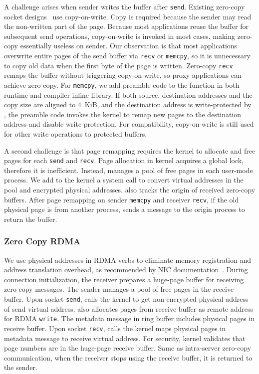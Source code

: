 A challenge arises when sender writes the buffer after \texttt{send}.
Existing zero-copy socket designs~\cite{thadani1995efficient,chu1996zero} use copy-on-write. Copy is required because the sender may read the non-written part of the page.
Because most applications reuse the buffer for subsequent send operations, copy-on-write is invoked in most cases, making zero-copy essentially useless on sender.
Our observation is that most applications overwrite entire pages of the send buffer via \texttt{recv} or \texttt{memcpy}, so it is unnecessary to copy old data when the first byte of the page is written.
Zero-copy \texttt{recv} remaps the buffer without triggering copy-on-write, so proxy applications can achieve zero copy.
For \texttt{memcpy}, we add preamble code to the function in both \libipc{} runtime and compiler inline library. If both source, destination addresses and the copy size are aligned to 4~KiB, and the destination address is write-protected by \libipc{}, the preamble code invokes the kernel to remap new pages to the destination address and disable write protection.
For compatibility, copy-on-write is still used for other write operations to protected buffers.

A second challenge is that page remapping requires the kernel to allocate and free pages for each \texttt{send} and \texttt{recv}. Page allocation in kernel acquires a global lock, therefore it is inefficient. Instead, \libipc{} manages a pool of free pages in each user-mode process.
We add to the kernel a system call to convert virtual addresses in the pool and encrypted physical addresses.
\libipc{} also tracks the origin of received zero-copy buffers.
After page remapping on sender \texttt{memcpy} and receiver \texttt{recv}, if the old physical page is from another process, \libipc{} sends a message to the origin process to return the buffer.

\subsubsection{Zero Copy RDMA}
\label{subsec:zero-copy-rdma}

We use physical addresses in RDMA verbs to eliminate memory registration and address translation overhead, as recommended by NIC documentation~\cite{mellanox}. During connection initialization, the receiver prepares a huge-page buffer for receiving zero-copy messages. The sender manages a pool of free pages in the receive buffer. Upon socket \texttt{send}, \libipc calls the kernel to get non-encrypted physical address of send virtual address. \libipc also allocates pages from receive buffer as remote address for RDMA \texttt{write}. The metadata message in ring buffer includes physical pages in receive buffer. Upon socket \texttt{recv}, \libipc calls the kernel maps physical pages in metadata message to receive virtual address. For security, kernel validates that page numbers are in the huge-page receive buffer. Same as intra-server zero-copy communication, when the receiver stops using the receive buffer, it is returned to the sender.

